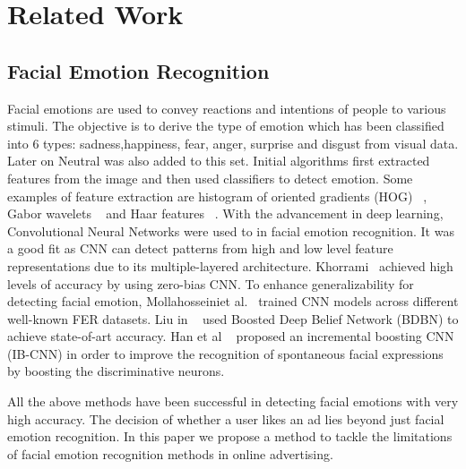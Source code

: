 \documentclass[10pt,twocolumn,letterpaper]{article}
\begin{document}
\section{Related Work}
\subsection{Facial Emotion Recognition}
Facial emotions are used to convey reactions and intentions of people to various stimuli. The objective is to derive the type of emotion which has been classified into 6 types: sadness,happiness, fear, anger, surprise and disgust from visual data. Later on Neutral was also added to this set. Initial algorithms first extracted features from the image and then used classifiers to detect emotion. Some examples of feature extraction are histogram of oriented gradients (HOG) ~\cite{Chen2014FacialER}, Gabor wavelets ~\cite{Gaborwavelets} and Haar features ~\cite{HaarFeature}. With the advancement in deep learning, Convolutional Neural Networks were used to in facial emotion recognition. It was a good fit as CNN can detect patterns from high and low level feature representations due to its multiple-layered architecture. Khorrami~\cite{Khorrami} achieved high levels of accuracy by using zero-bias CNN. To enhance generalizability for detecting facial emotion, Mollahosseiniet al.~\cite{Mollahosseini} trained CNN models across different well-known FER datasets. Liu in ~\cite{BDBN} used Boosted Deep Belief Network (BDBN) to achieve state-of-art accuracy. Han et al ~\cite{IB-CNN} proposed an incremental boosting CNN (IB-CNN) in order to improve the recognition of spontaneous facial expressions by boosting the discriminative neurons.

All the above methods have been successful in detecting facial emotions with very high accuracy. The decision of whether a user likes an ad lies beyond just facial emotion recognition. In this paper we propose a method to tackle the limitations of facial emotion recognition methods in online advertising.
\end{document}
